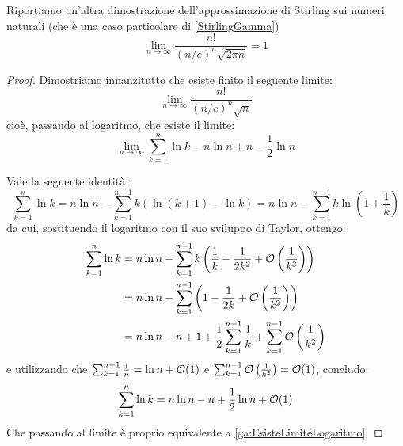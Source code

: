 \begin{theorem}\label{ga:ApproxStirlingNaturali}
	Riportiamo un'altra dimostrazione dell'approssimazione di Stirling sui numeri naturali (che è una caso
	particolare di \cref{StirlingGamma})
	\begin{equation*}
		\lim_{n\to\infty}{\frac{n!}{(n/e)^n\sqrt{2\pi n}}}=1
	\end{equation*}
\end{theorem}
\begin{proof}
	Dimostriamo innanzitutto che esiste finito il seguente limite:
	\begin{equation}\label{ga:EsisteLimite}
		\lim_{n\to\infty}{\frac{n!}{(n/e)^n\sqrt{n}}}
	\end{equation}
	cioè, passando al logaritmo, che esiste il limite:
	\begin{equation}\label{ga:EsisteLimiteLogaritmo}
		\lim_{n\to\infty}{\sum_{k=1}^{n}\ln k-n\ln n+n-\frac{1}{2}\ln n}
	\end{equation}
	
	Vale la seguente identità:
	\begin{equation*}
		\sum_{k=1}^{n}\ln k=n\ln n-\sum_{k=1}^{n-1}{k\left(\ln(k+1)-\ln k \right)}=n\ln n-\sum_{k=1}^{n-1}{k\ln\left(1+\frac{1}{k}\right)}
	\end{equation*}
	da cui, sostituendo il logaritmo con il suo sviluppo di Taylor, ottengo:
	\begin{equation*}
	\begin{split}
		\sum_{k=1}^{n}\ln k	& =n\ln n-\sum_{k=1}^{n-1}{k\left(\frac{1}{k}-\frac{1}{2k^2}+\mathcal{O}\left(\frac{1}{k^3}\right) \right)}\\
							& =n\ln n-\sum_{k=1}^{n-1}\left(1-\frac{1}{2k}+\mathcal{O}\left(\frac{1}{k^2}\right)  \right)\\
							& =n\ln n-n+1+\frac{1}{2}\sum_{k=1}^{n-1}\frac{1}{k}+\sum_{k=1}^{n-1}\mathcal{O}\left(\frac{1}{k^2}\right)
	\end{split}
	\end{equation*}
	e utilizzando che $\sum_{k=1}^{n-1}\frac{1}{n}=\ln n+\mathcal{O}(1)$ e 
	$\sum_{k=1}^{n-1}\mathcal{O}\left(\frac{1}{k^2}\right)=\mathcal{O}(1)$, concludo:
	\begin{equation}\label{ga:QuasiStirlingNaturali}
		\sum_{k=1}^{n}\ln k=n\ln n-n+\frac{1}{2}\ln n + \mathcal{O}(1)
	\end{equation}
	Che passando al limite è proprio equivalente a \cref{ga:EsisteLimiteLogaritmo}.
	

\end{proof}
